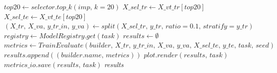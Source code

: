 \begin{algorithm}
\begin{algorithmic}
    \STATE $\textit{top20} \gets \textit{selector.top\_k}(\textit{imp},\, k=20)$
    \STATE $\textit{X\_sel\_tr} \gets \textit{X\_vt\_tr}[\textit{top20}]$
    \STATE $\textit{X\_sel\_te} \gets \textit{X\_vt\_te}[\textit{top20}]$
    \STATE {}
    \STATE $(\textit{X\_tr},\, \textit{X\_va},\, \textit{y\_tr\_in},\, \textit{y\_va}) \gets \textit{split}(\textit{X\_sel\_tr},\, \textit{y\_tr},\, \textit{ratio}=0.1,\, \textit{stratify}=\textit{y\_tr})$
    \STATE {}
    \STATE $\textit{registry} \gets \textit{ModelRegistry.get}(\textit{task})$
    \STATE $\textit{results} \gets \emptyset$
      \STATE {}
      \STATE $\textit{metrics} \gets \textit{TrainEvaluate}(\textit{builder},\, \textit{X\_tr},\, \textit{y\_tr\_in},\, \textit{X\_va},\, \textit{y\_va},\, \textit{X\_sel\_te},\, \textit{y\_te},\, \textit{task},\, \textit{seed})$
      \STATE $\textit{results}.\textit{append}((\textit{builder}.\textit{name},\, \textit{metrics}))$
    \ENDFOR
    \STATE {}
    \STATE $\textit{plot.render}(\textit{results},\, \textit{task})$
    \STATE {}
    \STATE $\textit{metrics\_io.save}(\textit{results},\, \textit{task})$
    \RETURN \textit{results}
  \end{algorithmic}
\end{algorithm}

